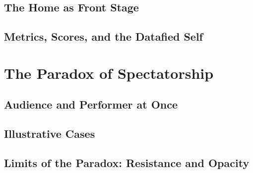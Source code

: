 \documentclass[11pt]{article}
\begin{document}
\subsection{The Home as Front Stage}

\subsection{Metrics, Scores, and the Datafied Self}

\section{The Paradox of Spectatorship}
\label{sec:paradox}

\subsection{Audience and Performer at Once}

\subsection{Illustrative Cases}

\subsection{Limits of the Paradox: Resistance and Opacity}

\end{document}
